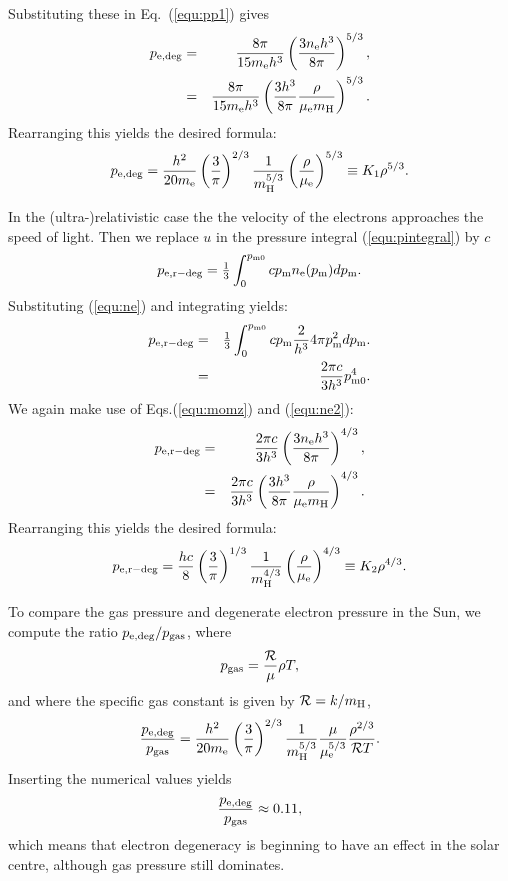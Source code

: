 \documentclass[12pt]{article}
\def\mue{\mu_{\rm e}}
\def\mH{m_{\rm H}}
\def\pmom{p_{\rm m}}
\def\pgas{p_{\rm gas}}
\def\pedeg{p_{\rm e,deg}}
\def\perdeg{p_{\rm e,r-deg}}
\def\pmomz{p_{\rm m0}}
\def\onethird{{\textstyle{1\over3}}}
\begin{document}
Substituting these in Eq.~(\ref{equ:pp1}) gives
\begin{eqnarray}
\pedeg &=& \frac{8\pi}{15 m_{\rm e} h^3} \left( \frac{3n_{\rm e}h^3}{8\pi} \right)^{5/3},\\
       &=& \frac{8\pi}{15 m_{\rm e} h^3} \left( \frac{3 h^3}{8\pi} \frac{\rho}{\mue \mH} \right)^{5/3}.
\end{eqnarray}
Rearranging this yields the desired formula:
\begin{equation}
\pedeg = \frac{h^2}{20 m_{\rm e}} \left(\frac{3}{\pi} \right)^{2/3} \frac{1}{m_{\rm H}^{5/3}} \left( \frac{\rho}{\mu_{\rm e}} \right)^{5/3} \equiv K_1 \rho^{5/3}.
\end{equation}

In the (ultra-)relativistic case the the velocity of the electrons
approaches the speed of light. Then we replace $u$ in the pressure
integral (\ref{equ:pintegral}) by $c$
\begin{eqnarray}
\perdeg = \onethird \int_0^{\pmomz} c \pmom n_{\rm e}(\pmom) d\pmom.
\end{eqnarray}
Substituting (\ref{equ:ne}) and integrating yields:
\begin{eqnarray}
\perdeg &=& \onethird \int_0^{\pmomz} c \pmom \frac{2}{h^3} 4\pi \pmom^2 d\pmom.\\
       &=& \frac{2\pi c}{3 h^3} \pmomz^4.\label{equ:pp2}
\end{eqnarray}
We again make use of Eqs.(\ref{equ:momz}) and (\ref{equ:ne2}):
\begin{eqnarray}
\perdeg &=& \frac{2\pi c}{3 h^3} \left( \frac{3n_{\rm e}h^3}{8\pi} \right)^{4/3},\\
        &=& \frac{2\pi c}{3 h^3} \left( \frac{3 h^3}{8\pi} \frac{\rho}{\mue \mH} \right)^{4/3}.
\end{eqnarray}
Rearranging this yields the desired formula:
\begin{equation}
\perdeg = \frac{hc}{8} \left(\frac{3}{\pi} \right)^{1/3} \frac{1}{m_{\rm H}^{4/3}} \left( \frac{\rho}{\mu_{\rm e}} \right)^{4/3} \equiv K_2 \rho^{4/3}.\label{equ:perdeg}
\end{equation}

To compare the gas pressure and degenerate electron pressure in the
Sun, we compute the ratio $\pedeg/\pgas$, where
\begin{equation}
\pgas = \frac{\cal R}{\mu} \rho T,
\end{equation}
and where the specific gas constant is given by ${\cal R} = k/m_{\rm
  H}$,
\begin{equation}
\frac{\pedeg}{\pgas} = \frac{h^2}{20 m_{\rm e}} \left(\frac{3}{\pi} \right)^{2/3} \frac{1}{m_{\rm H}^{5/3}} \frac{\mu}{\mue^{5/3}} \frac{\rho^{2/3}}{{\cal R} T}.
\end{equation}
Inserting the numerical values yields
\begin{equation}
\frac{\pedeg}{\pgas} \approx 0.11,
\end{equation}
which means that electron degeneracy is beginning to have an effect in
the solar centre, although gas pressure still dominates.
\end{document}

